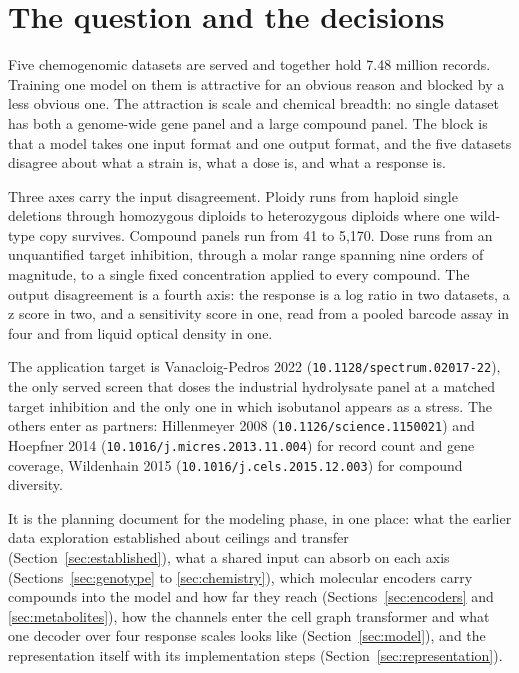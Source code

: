 
\section{The question and the decisions}
\label{sec:question}

Five chemogenomic datasets are served and together hold 7.48 million records. Training one
model on them is attractive for an obvious reason and blocked by a less obvious one. The
attraction is scale and chemical breadth: no single dataset has both a genome-wide gene panel
and a large compound panel. The block is that a model takes one input format and one output
format, and the five datasets disagree about what a strain is, what a dose is, and what a
response is.

Three axes carry the input disagreement. Ploidy runs from haploid single deletions through
homozygous diploids to heterozygous diploids where one wild-type copy survives. Compound panels
run from 41 to 5{,}170. Dose runs from an unquantified target inhibition, through a molar
range spanning nine orders of magnitude, to a single fixed concentration applied to every
compound. The output disagreement is a fourth axis: the response is a log ratio in two
datasets, a z score in two, and a sensitivity score in one, read from a pooled barcode assay
in four and from liquid optical density in one.

The application target is Vanacloig-Pedros 2022 (\texttt{10.1128/spectrum.02017-22}), the
only served screen that doses the industrial hydrolysate panel at a matched target inhibition
and the only one in which isobutanol appears as a stress. The others enter as partners:
Hillenmeyer 2008 (\texttt{10.1126/science.1150021}) and Hoepfner 2014
(\texttt{10.1016/j.micres.2013.11.004}) for record count and gene coverage, Wildenhain 2015
(\texttt{10.1016/j.cels.2015.12.003}) for compound diversity.

It is the planning document for the modeling phase, in one place: what the earlier data
exploration established about ceilings and transfer (Section~\ref{sec:established}), what a
shared input can absorb on each axis (Sections~\ref{sec:genotype} to \ref{sec:chemistry}),
which molecular encoders carry compounds into the model and how far they reach
(Sections~\ref{sec:encoders} and \ref{sec:metabolites}), how the channels enter the cell
graph transformer and what one decoder over four response scales looks like
(Section~\ref{sec:model}), and the representation itself with its implementation steps
(Section~\ref{sec:representation}).

